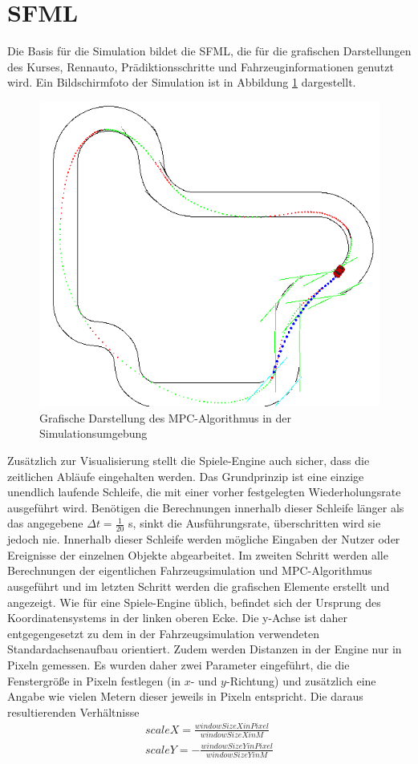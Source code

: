 \documentclass{like}
\begin{document}
\section{\acl{SFML}}
Die Basis für die Simulation bildet die \ac{SFML}, die für die grafischen Darstellungen des Kurses, Rennauto, Prädiktionsschritte und Fahr\-zeug\-in\-for\-ma\-ti\-onen genutzt wird. Ein Bildschirmfoto der Simulation ist in Abbildung \ref{fig:simVisual} dargestellt.
\begin{figure}[ht!]
	\centering
	\includegraphics[width=350pt]{Abbildungen/sim_visual.png}
	\caption{Grafische Darstellung des MPC-Algorithmus in der Simulationsumgebung}
	\label{fig:simVisual}
\end{figure} 
Zusätzlich zur Visualisierung stellt die Spiele-Engine auch sicher, dass die zeitlichen Abläufe ein\-ge\-hal\-ten werden. Das Grundprinzip ist eine einzige unendlich laufende Schleife, die mit einer vorher festgelegten Wiederholungsrate ausgeführt wird. Benötigen die Berechnungen innerhalb dieser Schleife länger als das angegebene
$\Delta t =  \frac{1}{20}$ s, sinkt die Ausführungsrate, überschritten wird sie jedoch nie. Innerhalb dieser Schleife werden mögliche Eingaben der Nutzer oder Ereignisse der einzelnen Objekte abgearbeitet. Im zweiten Schritt werden alle Berechnungen der eigentlichen Fahrzeugsimulation und \ac{MPC}-Algorithmus ausgeführt und im letzten Schritt werden die grafischen Elemente erstellt und angezeigt. Wie für eine Spiele-Engine üblich, befindet sich der Ursprung des Koordinatensystems in der linken oberen Ecke. Die y-Achse ist daher entgegengesetzt zu dem in der Fahrzeugsimulation verwendeten Standardachsenaufbau orientiert. Zudem werden Distanzen in der Engine nur in Pixeln gemessen. Es wurden daher zwei Parameter eingeführt, die die Fenstergröße in Pixeln festlegen (in \(x\)- und  \(y\)-Richtung) und zusätzlich eine Angabe wie vielen Metern dieser jeweils in Pixeln entspricht. Die daraus resultierenden Verhältnisse 
\begin{eqnarray}
	scaleX = \frac{windowSizeXinPixel}{windowSizeXinM} \\
	scaleY = - \frac{windowSizeYinPixel}{windowSizeYinM} 
\end{eqnarray}
\end{document}
